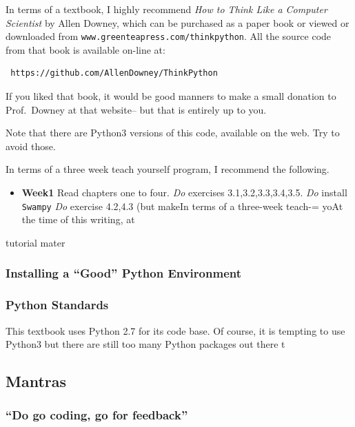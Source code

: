 In terms of a textbook, I highly recommend \emph{How to Think Like a
Computer Scientist} by Allen Downey, which can be purchased as a paper
book or viewed or downloaded from
\texttt{www.greenteapress.com/thinkpython}. All the source code from
that book is available on-line at:

\begin{lstlisting}
 https://github.com/AllenDowney/ThinkPython
\end{lstlisting}

If you liked that book, it would be good manners to make a small
donation to Prof.~Downey at that website-- but that is entirely up to
you.

Note that there are Python3 versions of this code, available on the web.
Try to avoid those.

In terms of a three week teach yourself program, I recommend the
following.

\begin{itemize}
\itemsep1pt\parskip0pt
\item
  \textbf{Week1} Read chapters one to four. \emph{Do} exercises
  3.1,3.2,3.3,3.4,3.5. \emph{Do} install \texttt{Swampy} \emph{Do}
  exercise 4.2,4.3 (but makeIn terms of a three-week teach-= yoAt the
  time of this writing, at
\end{itemize}

tutorial mater

\subsubsection{Installing a ``Good'' Python
Environment}\label{installing-a-good-python-environment}

\subsubsection{Python Standards}\label{python-standards}

This textbook uses Python 2.7 for its code base. Of course, it is
tempting to use Python3 but there are still too many Python packages out
there t

\subsection{Mantras}\label{mantras}

\subsubsection{\texorpdfstring{``Do go coding, go for
feedback''}{Do go coding, go for feedback}}\label{do-go-coding-go-for-feedback}

